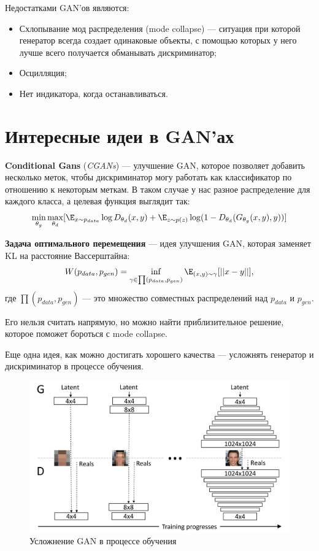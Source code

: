 Недостатками GAN'ов являются:
\begin{itemize}
    \item Схлопывание мод распределения (mode collapse) --- ситуация при которой генератор всегда создает одинаковые объекты, с помощью которых у него лучше всего получается обманывать дискриминатор;
    \item Осцилляция;
    \item Нет индикатора, когда останавливаться.
\end{itemize}

\section{Интересные идеи в GAN'ах}

\begin{definition}
    \textbf{Conditional Gans} (\textit{CGANs}) --- улучшение GAN, которое позволяет добавить несколько меток, чтобы дискриминатор могу работать как классификатор по отношению к некоторым меткам. В таком случае у нас разное распределение для каждого класса, а целевая функция выглядит так:
    \[
        \min_{\theta_g}\max_{\theta_d}[\E_{x\sim p_{data}}\log D_{\theta_d}(x,y)+   \E_{z\sim p(z)}\log(1-D_{\theta_d}(G_{\theta_g}(x,y), y))]
    \]
\end{definition}

\begin{definition}
    \textbf{Задача оптимального перемещения} --- идея улучшения GAN, которая заменяет KL на расстояние Вассерштайна:
    \[
        W(p_{data},p_{gen})=\inf_{\gamma\in\prod(p_{data},p_{gen})}\E_{(x,y)\sim\gamma}[||x-y||],
    \]
    где $\prod(p_{data},p_{gen})$ --- это множество совместных распределений над $p_{data}$ и $p_{gen}$.
    \begin{remark}
        Его нельзя считать напрямую, но можно найти приблизительное решение, которое поможет бороться с mode collapse.
    \end{remark}
\end{definition}

Еще одна идея, как можно достигать хорошего качества --- усложнять генератор и дискриминатор в процессе обучения.

\begin{figure}
    \centering
    \includegraphics[width=\textwidth]{images/gan-training.png}
    \caption{Усложнение GAN в процессе обучения}
\end{figure}

